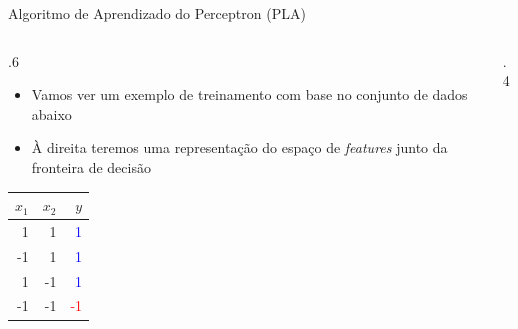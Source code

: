 \documentclass[aspectratio=169,xcolor=dvipsnames]{beamer}
\begin{document}
\begin{frame}{Algoritmo de Aprendizado do Perceptron (PLA)}
\begin{columns}
    \begin{column}{.6\textwidth}
    \begin{itemize}
        \item Vamos ver um exemplo de treinamento com base no conjunto de dados abaixo
        \item À direita teremos uma representação do espaço de \textit{features} junto da fronteira de decisão
    \end{itemize}
        \begin{table}
            \centering
            \begin{tabular}{|r|r|r|}
                \hline
                $x_1$ & $x_2$  & $y$  \\
                \hline
                1 & 1&\textcolor{blue}{1} \\
                \hline
                -1 & 1&\textcolor{blue}{1} \\
                \hline
                1 & -1&\textcolor{blue}{1} \\
                \hline
                -1 & -1&\textcolor{red}{-1} \\
                \hline
            \end{tabular}
        \end{table} 
    \end{column}
    \begin{column}{.4\textwidth}
    \centering
    \providecommand{\figfuncdecision}{x*x}
    \resizebox{\linewidth}{!}{
        
    }
    \end{column}
\end{columns}
\end{frame}
\end{document}
